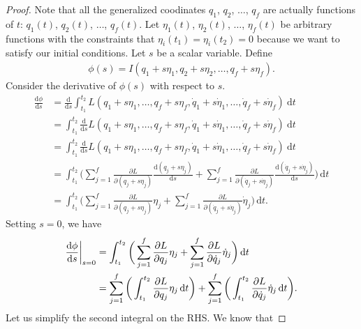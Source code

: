 \documentclass[10pt]{article}
\newcommand{\dee}{\mathrm{d}}
\begin{document}
\begin{itemize}
  	\begin{proof}
  		Note that all the generalized coodinates $q_1$, $q_2$, $\dotsc$, $q_f$ are actually functions of $t$: $q_1(t)$, $q_2(t)$, $\dotsc$, $q_f(t)$. Let $\eta_1(t)$, $\eta_2(t)$, $\dotsc$, $\eta_f(t)$ be arbitrary functions with the constraints that $\eta_i(t_1) = \eta_i(t_2) = 0$ because we want to satisfy our initial conditions. Let $s$ be a scalar variable. Define
  		\begin{align*}
  			\phi(s) = I(q_1 + s\eta_1, q_2 + s\eta_2, \dotsc, q_f + s\eta_f).
  		\end{align*}
  		Consider the derivative of $\phi(s)$ with respect to $s$.
  		\begin{align*}
  		\frac{\dee \phi}{\dee s}  		
  		&= \frac{\dee}{\dee s} \int_{t_1}^{t_2} L(q_1 + s\eta_1, \dotsc, q_f + s\eta_f, \dot{q}_1 + s\dot{\eta}_1, \dotsc, \dot{q}_f + s\dot{\eta}_f)\ \dee t \\
  		&= \int_{t_1}^{t_2} \frac{\dee}{\dee s} L(q_1 + s\eta_1, \dotsc, q_f + s\eta_f, \dot{q}_1 + s\dot{\eta}_1, \dotsc, \dot{q}_f + s\dot{\eta}_f)\ \dee t \\
  		&= \int_{t_1}^{t_2} \frac{\dee}{\dee s} L(q_1 + s\eta_1, \dotsc, q_f + s\eta_f, \dot{q}_1 + s\dot{\eta}_1, \dotsc, \dot{q}_f + s\dot{\eta}_f)\ \dee t \\
  		&= \int_{t_1}^{t_2} \bigg( \sum_{j=1}^f \frac{\partial L}{\partial (q_j + s\eta_j)} \frac{\dee (q_j + s\eta_j)}{\dee s} + \sum_{j=1}^f \frac{\partial L}{\partial (\dot{q}_j + s\dot{\eta}_j)} \frac{\dee (\dot{q}_j + s\dot{\eta}_j)}{\dee s}\bigg)\, \dee t \\
  		&= \int_{t_1}^{t_2} \bigg( \sum_{j=1}^f \frac{\partial L}{\partial (q_j + s\eta_j)} \eta_j + \sum_{j=1}^f \frac{\partial L}{\partial (\dot{q}_j + s\dot{\eta}_j)} \dot{\eta}_j \bigg)\, \dee t.
  		\end{align*}
  		Setting $s = 0$, we have
  		\begin{align}
  		\frac{\dee \phi}{\dee s}\bigg|_{s=0}
  		&= \int_{t_1}^{t_2} \bigg( \sum_{j=1}^f \frac{\partial L}{\partial q_j} \eta_j + \sum_{j=1}^f \frac{\partial L}{\partial \dot{q}_j} \dot{\eta}_j \bigg)\, \dee t \notag \\
  		&= \sum_{j=1}^f \bigg( \int_{t_1}^{t_2} \frac{\partial L}{\partial q_j} \eta_j\, \dee t \bigg) + \sum_{j=1}^f \bigg( \int_{t_1}^{t_2} \frac{\partial L}{\partial \dot{q}_j} \dot{\eta}_j \, \dee t \bigg). \label{dee-phi-dee-s-zero}
  		\end{align}
  		Let us simplify the second integral on the RHS. We know that

\end{proof}
\end{itemize}
\end{document}

